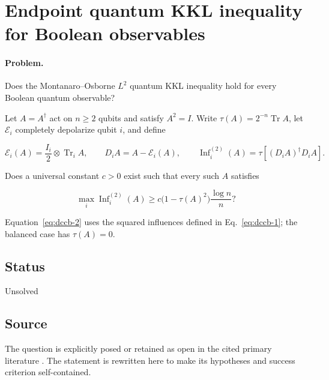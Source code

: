 \section{Endpoint quantum KKL inequality for Boolean observables}
\label{sec:op_dccbfd9860e08b89}

\paragraph{Problem.}
Does the Montanaro--Osborne $L^2$ quantum KKL inequality hold for every Boolean quantum observable?

Let $A=A^\dagger$ act on $n\geq2$ qubits and satisfy $A^2=I$. Write $\tau(A)=2^{-n}\operatorname{Tr}A$, let $\mathcal E_i$ completely depolarize qubit $i$, and define

\begin{equation}
\mathcal E_i(A)=\frac{I_i}{2}\otimes\operatorname{Tr}_iA,
\qquad
D_iA=A-\mathcal E_i(A),
\qquad
\operatorname{Inf}^{(2)}_i(A)=\tau[(D_iA)^\dagger D_iA].
\label{eq:dccb-1}
\end{equation}

Does a universal constant $c>0$ exist such that every such $A$ satisfies

\begin{equation}
\max_i\operatorname{Inf}^{(2)}_i(A)
\geq c\bigl(1-\tau(A)^2\bigr)\frac{\log n}{n}?
\label{eq:dccb-2}
\end{equation}

Equation~\eqref{eq:dccb-2} uses the squared influences defined in Eq.~\eqref{eq:dccb-1}; the balanced case has $\tau(A)=0$.

\subsection*{Status}

Unsolved

\subsection*{Source}

The question is explicitly posed or retained as open in the cited primary literature .  The statement is rewritten here to make its hypotheses and success criterion self-contained.

